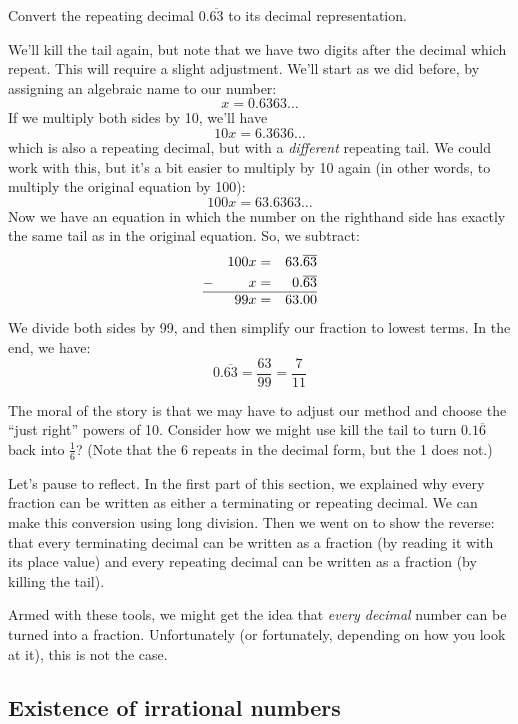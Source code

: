 \begin{boxedex}
Convert the repeating decimal $0.\overline{63}$ to its decimal representation.

\bigskip{} We'll kill the tail again, but note that we have two digits after the decimal which repeat. This will require a slight adjustment. We'll start as we did before, by assigning an algebraic name to our number:\[x = 0.6363\dotso\]
If we multiply both sides by 10, we'll have \[10x = 6.3636\dotso\] which is also a repeating decimal, but with a \textit{different} repeating tail. We could work with this, but it's a bit easier to multiply by 10 again (in other words, to multiply the original equation by 100): \[100x = 63.6363\dotso\] Now we have an equation in which the number on the righthand side has exactly the same tail as in the original equation. So, we subtract:
\[\begin{aligned}
	&&	100x	&= &63.\overline{63}\\
- 	&& 	x 		&= &0.\overline{63}\\\hline
	&&	99x 	&= &63.00
\end{aligned}\] We divide both sides by 99, and then simplify our fraction to lowest terms. In the end, we have: \[0.\overline{63} = \frac{63}{99} = \frac{7}{11}\]
\end{boxedex}

The moral of the story is that we may have to adjust our method and choose the ``just right'' powers of 10. Consider how we might use kill the tail to turn $0.1\overline{6}$ back into $\frac{1}{6}$? (Note that the 6 repeats in the decimal form, but the 1 does not.)

Let's pause to reflect. In the first part of this section, we explained why every fraction can be written as either a terminating or repeating decimal. We can make this conversion using long division. Then we went on to show the reverse: that every terminating decimal can be written as a fraction (by reading it with its place value) and every repeating decimal can be written as a fraction (by killing the tail).

Armed with these tools, we might get the idea that \textit{every decimal} number can be turned into a fraction. Unfortunately (or fortunately, depending on how you look at it), this is not the case.

\subsection{Existence of irrational numbers}

